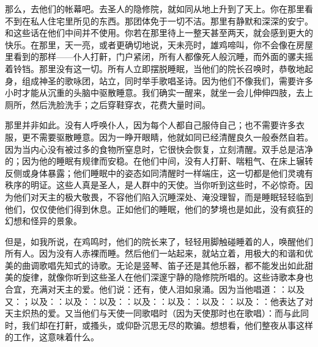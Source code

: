 那么，去他们的帐幕吧。去圣人的隐修院，就如同从地上升到了天上。你在那里看不到在私人住宅里所见的东西。那团体免于一切不洁。那里有静默和深深的安宁。和这些话在他们中间并不使用。你若在那里待上一整天甚至两天，就会感到更大的快乐。在那里，天一亮，或者更确切地说，天未亮时，雄鸡啼叫，你不会像在房屋里看到的那样——仆人打鼾，门户紧闭，所有人都像死人般沉睡，而外面的骡夫摇着铃铛。那里没有这一切。所有人立即摆脱睡眠，当他们的院长召唤时，恭敬地起身，组成神圣的歌咏团，站立，同时举手歌唱圣诗。因为他们不像我们，需要许多小时才能从沉重的头脑中驱散睡意。我们确实一醒来，就坐一会儿伸伸四肢，去上厕所，然后洗脸洗手；之后穿鞋穿衣，花费大量时间。\par

那里并非如此。没有人呼唤仆人，因为每个人都自己服侍自己；也不需要许多衣服，更不需要驱散睡意。因为一睁开眼睛，他就如同已经清醒良久一般泰然自若。因为当内心没有被过多的食物所窒息时，它很快会恢复，立刻清醒。双手总是洁净的；因为他的睡眠有规律而安稳。在他们中间，没有人打鼾、喘粗气、在床上辗转反侧或身体暴露；他们睡眠中的姿态如同清醒时一样端庄，这一切都是他们灵魂有秩序的明证。这些人真是圣人，是人群中的天使。当你听到这些时，不必惊奇。因为他们对天主的极大敬畏，不容他们陷入沉睡深处、淹没理智，而是睡眠轻轻临到他们，仅仅使他们得到休息。正如他们的睡眠，他们的梦境也是如此，没有疯狂的幻想和怪异的景象。\par

但是，如我所说，在鸡鸣时，他们的院长来了，轻轻用脚触碰睡着的人，唤醒他们所有人。因为没有人赤裸而睡。然后他们一站起来，就站立着，用极大的和谐和优美的曲调歌唱先知式的诗歌。无论是竖琴、笛子还是其他乐器，都不能发出如此甜美的旋律，就像你听到这些圣人在他们深邃宁静的隐修院所唱的。这些诗歌本身也合宜，充满对天主的爱。他们说：还有，使人泪如泉涌。因为当他唱道：：以及又：；以及：：以及：：以及：：以及：：以及：：以及：：以及：：他表达了对天主炽热的爱。又当他们与天使一同歌唱时（因为天使那时也在歌唱）：而与此同时，我们却在打鼾，或搔头，或仰卧沉思无尽的欺骗。想想看，他们整夜从事这样的工作，这意味着什么。\par

